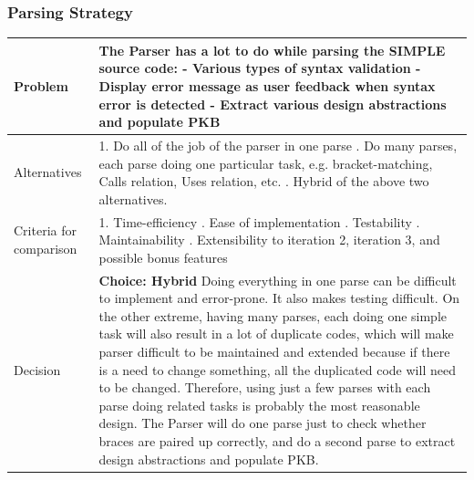 \documentclass[12pt]{article}
\begin{document}
{{{{{{{{{{\subsubsection{Parsing Strategy}
\begin{tabular}{|L{5cm} | L{12cm}| }
\hline
Problem &
The Parser has a lot to do while parsing the SIMPLE source code:\newline
- Various types of syntax validation
\newline - Display error message as user feedback when syntax error is detected
\newline - Extract various design abstractions and populate PKB
 \\
    \hline
    Alternatives &
1. Do all of the job of the parser in one parse
. Do many parses, each parse doing one particular task, e.g. bracket-matching, Calls relation, Uses relation, etc.
. Hybrid of the above two alternatives. \\
\hline
    Criteria for comparison &
1. Time-efficiency
. Ease of implementation
. Testability
. Maintainability
. Extensibility to iteration 2, iteration 3, and possible bonus features 
 \\
 \hline
   Decision & \textbf{Choice: Hybrid}
\newline
Doing everything in one parse can be difficult to implement and error-prone. It also makes testing difficult. On the other extreme, having many parses, each doing one simple task will also result in a lot of duplicate codes, which will make parser difficult to be maintained and extended because if there is a need to change something, all the duplicated code will need to be changed.
\newline
Therefore, using just a few parses with each parse doing related tasks is probably the most reasonable design. The Parser will do one parse just to check whether braces are paired up correctly, and do a second parse to extract design abstractions and populate PKB.
 \\
 \hline
\end{tabular}
}}}}}}}}}}
\end{document}

